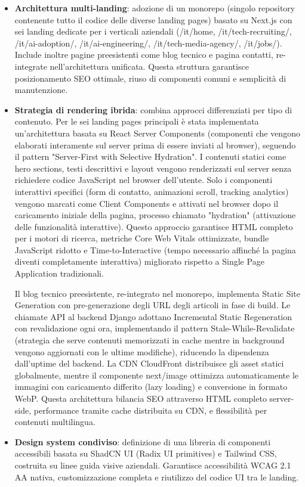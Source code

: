 \begin{itemize}
  \item \textbf{Architettura multi-landing}: adozione di un monorepo (singolo 
  repository contenente tutto il codice delle diverse landing pages) basato su 
  Next.js con sei landing dedicate per i verticali aziendali (/it/home, 
  /it/tech-recruiting/, /it/ai-adoption/, /it/ai-engineering/, 
  /it/tech-media-agency/, /it/jobs/). Include inoltre pagine 
  preesistenti come blog tecnico e pagina contatti, re-integrate 
  nell'architettura unificata. Questa struttura garantisce posizionamento 
  SEO ottimale, riuso di componenti comuni e semplicità di manutenzione.
  
  \item \textbf{Strategia di rendering ibrida}: combina approcci 
  differenziati per tipo di contenuto. Per le sei landing pages principali è 
  stata implementata un'architettura basata su React Server Components 
  (componenti che vengono elaborati interamente sul server prima di essere 
  inviati al browser), seguendo il pattern "Server-First with Selective 
  Hydration". I contenuti statici come hero sections, testi descrittivi e 
  layout vengono renderizzati sul server senza richiedere codice JavaScript 
  nel browser dell'utente. Solo i componenti interattivi specifici (form di 
  contatto, animazioni scroll, tracking analytics) vengono marcati come Client 
  Components e attivati nel browser dopo il caricamento iniziale della pagina, 
  processo chiamato "hydration" (attivazione delle funzionalità interattive). 
  Questo approccio garantisce HTML completo per i motori di ricerca, metriche 
  Core Web Vitals ottimizzate, bundle JavaScript ridotto e Time-to-Interactive 
  (tempo necessario affinché la pagina diventi completamente interattiva) 
  migliorato rispetto a Single Page Application tradizionali.
  
  Il blog tecnico preesistente, re-integrato nel monorepo, implementa Static 
  Site Generation con pre-generazione degli URL degli articoli in fase di build. 
  Le chiamate API al backend Django adottano Incremental Static Regeneration 
  con revalidazione ogni ora, implementando il pattern Stale-While-Revalidate 
  (strategia che serve contenuti memorizzati in cache mentre in background 
  vengono aggiornati con le ultime modifiche), riducendo la dipendenza 
  dall'uptime del backend. La CDN CloudFront 
  distribuisce gli asset statici globalmente, mentre il componente next/image 
  ottimizza automaticamente le immagini con caricamento differito (lazy loading) 
  e conversione in formato WebP. Questa architettura bilancia SEO attraverso 
  HTML completo server-side, performance tramite cache distribuita su CDN, 
  e flessibilità per contenuti multilingua.
  
  \item \textbf{Design system condiviso}: definizione di una libreria di componenti 
  accessibili basata su ShadCN UI (Radix UI primitives) e Tailwind CSS, costruita 
  su linee guida visive aziendali. Garantisce accessibilità WCAG 2.1 AA nativa, 
  customizzazione completa e riutilizzo del codice UI tra le landing.
\end{itemize}

